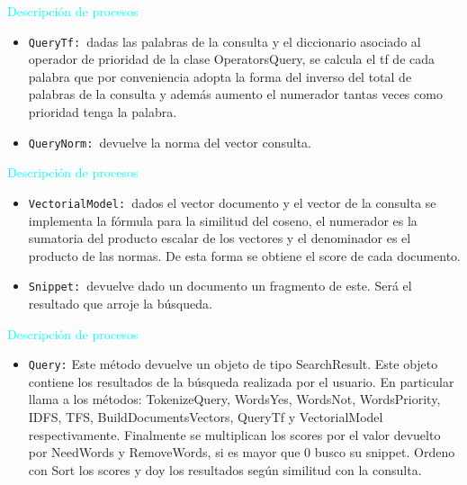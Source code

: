 \documentclass[a4paper, 12pt]{beamer}
\begin{document}
\begin{frame}{\textcolor{cyan}{Descripción de procesos}}
    \begin{itemize}
        \item {\small {\tt QueryTf: }dadas las palabras de la consulta y el diccionario asociado al
        operador de prioridad de la clase OperatorsQuery, se calcula el tf de cada
        palabra que por conveniencia adopta la forma del inverso del total de
        palabras de la consulta y además aumento el numerador tantas veces como
        prioridad tenga la palabra.}
        \item {\small {\tt QueryNorm: }devuelve la norma del vector consulta.}
    \end{itemize}
\end{frame}

\begin{frame}{\textcolor{cyan}{Descripción de procesos}}
    \begin{itemize}
        \item {\small {\tt VectorialModel: }dados el vector documento y el vector de la consulta
        se implementa la fórmula para la similitud del coseno,
        el numerador es la sumatoria del producto escalar de los vectores y el
        denominador es el producto de las normas. De esta forma se obtiene el score
        de cada documento.}
        \item {\small {\tt Snippet:  }devuelve dado un documento un fragmento de este. Será el
        resultado que arroje la búsqueda.}
    \end{itemize}
\end{frame}

\begin{frame}{\textcolor{cyan}{Descripción de procesos}}
    \begin{itemize}
    \item {\small {\tt Query:} Este método devuelve un objeto de tipo SearchResult. 
        Este objeto contiene los resultados de la búsqueda realizada por el usuario. 
        En particular llama a los métodos: TokenizeQuery, WordsYes, WordsNot, WordsPriority, IDFS, 
        TFS, BuildDocumentsVectors, QueryTf y VectorialModel respectivamente.
        Finalmente se multiplican los scores por el valor devuelto por NeedWords y
        RemoveWords, si es mayor que 0 busco su snippet. Ordeno con Sort los
        scores y doy los resultados según similitud con la consulta.}
    \end{itemize}
\end{frame}
\end{document}
